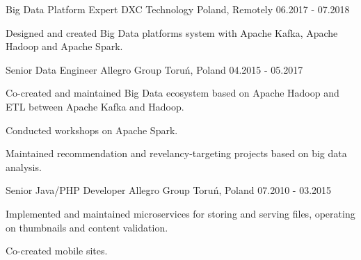 \begin{cventries}
  \cventry
    {Big Data Platform Expert} %
    {DXC Technology} %
    {Poland, Remotely} %
    {06.2017 - 07.2018} %
    {
      \begin{cvitems} %
        \item {Designed and created Big Data platforms system with Apache Kafka, Apache Hadoop and Apache Spark.}
      \end{cvitems}
    }

  \cventry
    {Senior Data Engineer} %
    {Allegro Group} %
    {Toruń, Poland} %
    {04.2015 - 05.2017} %
    {
      \begin{cvitems} %
        \item {Co-created and maintained Big Data ecosystem based on Apache Hadoop and ETL between Apache Kafka and Hadoop.}
        \item {Conducted workshops on Apache Spark.}
        \item {Maintained recommendation and revelancy-targeting projects based on big data analysis.}
      \end{cvitems}
    }

  \cventry
    {Senior Java/PHP Developer} %
    {Allegro Group} %
    {Toruń, Poland} %
    {07.2010 - 03.2015} %
    {
      \begin{cvitems} %
        \item {Implemented and maintained microservices for storing and serving files, operating on thumbnails and content validation.}
        \item {Co-created mobile sites.}
      \end{cvitems}
    }

\end{cventries}
